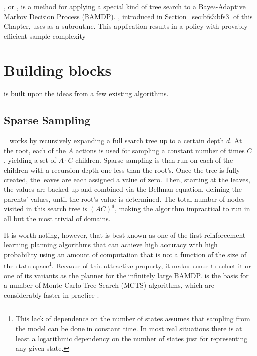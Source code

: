 \label{chap:bfs3}

, or , is a method for applying a special kind of tree search to a Bayes-Adaptive Markov Decision Process (BAMDP). , introduced in Section~\ref{sec:bfs3:bfs3} of this Chapter, uses  as a subroutine. This application results in a policy with provably efficient sample complexity.

\section{Building blocks}

 is built upon the ideas from a few existing algorithms.

\subsection{Sparse Sampling}

~\cite{kearns99b} works by recursively expanding a full search tree up to a certain depth $d$. At the root, each of the $A$ actions is used for sampling a constant number of times $C$, yielding a set of $A\cdot C$ children. Sparse sampling is then run on each of the children with a recursion depth one less than the root's. Once the tree is fully created, the leaves are each assigned a value of zero. Then, starting at the leaves, the values are backed up and combined via the Bellman equation, defining the parents' values, until the root's value is determined. The total number of nodes visited in this search tree is $(AC)^d$, making the algorithm impractical to run in all but the most trivial of domains.

It is worth noting, however, that  is best known as one of the first reinforcement-learning planning algorithms that can achieve high accuracy with high probability using an amount of computation that is not a function of the size of the state space\footnote{This lack of dependence on the number of states assumes that sampling from the model can be done in constant time. In most real situations there is at least a logarithmic dependency on the number of states just for representing any given state.}. Because of this attractive property, it makes sense to select it or one of its variants as the planner for the infinitely large BAMDP.   is the basis for a number of Monte-Carlo Tree Search (MCTS) algorithms, which are considerably faster in practice \cite{kocsis06,walsh10,wang05}. \note{ml: "[wel", jta: unfinished comment?}

